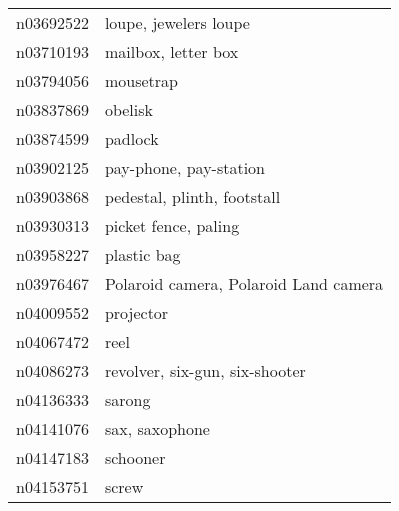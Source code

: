 \begin{appendices}
\begin{scriptsize}
\begin{longtabu}{X|X[4]}
    		n03692522 &                                                                                                      loupe, jewelers loupe \tabularnewline
    		n03710193 &                                                                                                        mailbox, letter box \tabularnewline
    		n03794056 &                                                                                                                  mousetrap \tabularnewline
    		n03837869 &                                                                                                                    obelisk \tabularnewline
    		n03874599 &                                                                                                                    padlock \tabularnewline
    		n03902125 &                                                                                                     pay-phone, pay-station \tabularnewline
    		n03903868 &                                                                                                pedestal, plinth, footstall \tabularnewline
    		n03930313 &                                                                                                       picket fence, paling \tabularnewline
    		n03958227 &                                                                                                                plastic bag \tabularnewline
    		n03976467 &                                                                                      Polaroid camera, Polaroid Land camera \tabularnewline
    		n04009552 &                                                                                                                  projector \tabularnewline
    		n04067472 &                                                                                                                       reel \tabularnewline
    		n04086273 &                                                                                             revolver, six-gun, six-shooter \tabularnewline
    		n04136333 &                                                                                                                     sarong \tabularnewline
    		n04141076 &                                                                                                             sax, saxophone \tabularnewline
    		n04147183 &                                                                                                                   schooner \tabularnewline
    		n04153751 &                                                                                                                      screw \tabularnewline

\end{longtabu}
\end{scriptsize}
\end{appendices}
